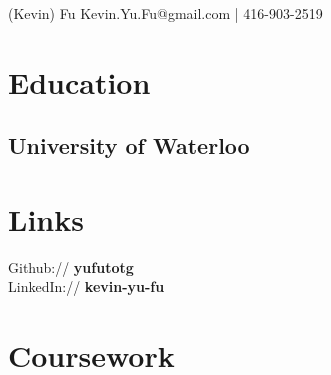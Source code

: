 \documentclass[letterpaper]{kevin-resume} %
\begin{document}


 {(Kevin) Fu} { %
	Kevin.Yu.Fu@gmail.com | 416-903-2519 %
}


\begin{minipage}[t]{0.30\textwidth} %


\section{Education} 

\subsection{University of Waterloo}




\section{Links} 

Github:// \textbf{yufutotg} \\
LinkedIn:// \textbf{kevin-yu-fu} \\

\sectionspace %


\section{Coursework}


\end{minipage}
\end{document}
